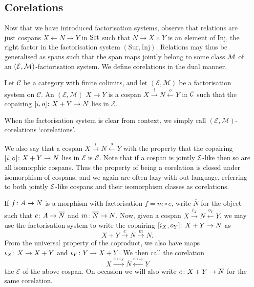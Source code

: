 \subsection{Corelations}
Now that we have introduced factorisation systems, observe that relations are
just cospans $X \leftarrow N \to Y$ in $\mathrm{Set}$ such that $N \to X \times Y$ is an
element of $\mathrm{Inj}$, the right factor in the factorisation system
$(\mathrm{Sur},\mathrm{Inj})$. Relations may thus be generalised as spans such
that the span maps jointly belong to some class $\mathcal M$ of an $(\mathcal E,\mathcal
M)$-factorisation system. We define corelations in the dual manner.

\begin{definition}
  Let $\mathcal C$ be a category with finite colimits, and let $(\mathcal E,
  \mathcal M)$ be a factorisation system on $\mathcal C$. An $(\mathcal
  E,\mathcal M)$ $X \to Y$ is a cospan $X
  \stackrel{i}\longrightarrow N \stackrel{o}\longleftarrow Y$ in $\mathcal C$ such
  that the copairing $[i,o]{\colon} X+Y \to N$ lies in $\mathcal E$.
\end{definition}

When the factorisation system is clear from context, we simply call $(\mathcal
E,\mathcal M)$-corelations `corelations'.

We also say that a cospan $X \stackrel{i}\longrightarrow N
\stackrel{o}\longleftarrow Y$ with the property that the copairing $[i,o]{\colon}
X+Y \to N$ lies in $\mathcal E$ is  $\mathcal E$.
Note that if a cospan is jointly $\mathcal E$-like then so are all isomorphic
cospans. Thus the property of being a corelation is closed under isomorphism of
cospans, and we again are often lazy with out language, referring to both
jointly $\mathcal E$-like cospans and their isomorphism classes as corelations. 

If $f{\colon} A \to N$ is a morphism with factorisation $f = m \circ e$, write
$\overline N$ for the object such that $e{\colon} A \to \overline N$ and $m{\colon}
\overline N \to N$. Now, given a cospan $X \stackrel{i_X}{\longrightarrow} N
\stackrel{o_Y}{\longleftarrow} Y$, we may use the factorisation system to write
the copairing $[i_X,o_Y]{\colon} X+Y \to N$ as
\[
  X+Y \stackrel{e}{\longrightarrow} \overline{N} \stackrel{m}{\longrightarrow}
  N.
\]
From the universal property of the coproduct, we also have maps $\iota_X{\colon} X
\to X+Y$ and $\iota_Y{\colon} Y \to X+Y$. We then call the corelation 
\[
  X \stackrel{e\circ \iota_X}{\longrightarrow} \overline{N} \stackrel{e \circ
  \iota_Y}{\longleftarrow} Y
\]
the $\mathcal E$ of the above cospan. On occasion we will also
write $e{\colon} X+Y \to \overline N$ for the same corelation.

